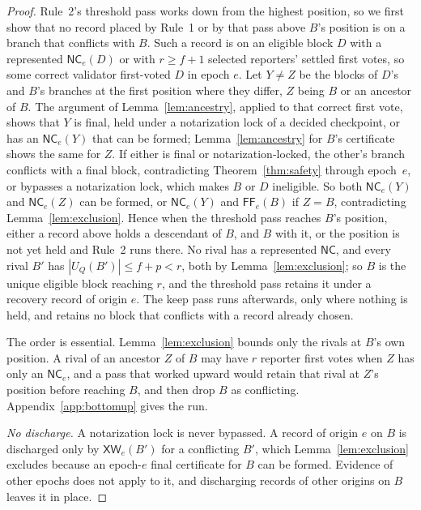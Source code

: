 \documentclass[conference]{IEEEtran}
\newcommand{\NC}{\mathsf{NC}}
\newcommand{\XW}{\mathsf{XW}}
\newcommand{\FF}{\mathsf{FF}}
\begin{document}
\begin{proof}
Rule~2's threshold pass works down from the highest position, so we first show that no record placed by Rule~1 or by that pass above $B$'s position is on a branch that conflicts with $B$. Such a record is on an eligible block $D$ with a represented $\NC_e(D)$ or with $r\ge f+1$ selected reporters' settled first votes, so some correct validator first-voted $D$ in epoch $e$. Let $Y\neq Z$ be the blocks of $D$'s and $B$'s branches at the first position where they differ, $Z$ being $B$ or an ancestor of $B$. The argument of Lemma~\ref{lem:ancestry}, applied to that correct first vote, shows that $Y$ is final, held under a notarization lock of a decided checkpoint, or has an $\NC_e(Y)$ that can be formed; Lemma~\ref{lem:ancestry} for $B$'s certificate shows the same for $Z$. If either is final or notarization-locked, the other's branch conflicts with a final block, contradicting Theorem~\ref{thm:safety} through epoch~$e$, or bypasses a notarization lock, which makes $B$ or $D$ ineligible. So both $\NC_e(Y)$ and $\NC_e(Z)$ can be formed, or $\NC_e(Y)$ and $\FF_e(B)$ if $Z=B$, contradicting Lemma~\ref{lem:exclusion}. Hence when the threshold pass reaches $B$'s position, either a record above holds a descendant of $B$, and $B$ with it, or the position is not yet held and Rule~2 runs there. No rival has a represented $\NC$, and every rival $B'$ has $|U_Q(B')|\le f+p<r$, both by Lemma~\ref{lem:exclusion}; so $B$ is the unique eligible block reaching $r$, and the threshold pass retains it under a recovery record of origin $e$. The keep pass runs afterwards, only where nothing is held, and retains no block that conflicts with a record already chosen.

The order is essential. Lemma~\ref{lem:exclusion} bounds only the rivals at $B$'s own position. A rival of an ancestor $Z$ of $B$ may have $r$ reporter first votes when $Z$ has only an $\NC_e$, and a pass that worked upward would retain that rival at $Z$'s position before reaching $B$, and then drop $B$ as conflicting. Appendix~\ref{app:bottomup} gives the run.

\emph{No discharge.} A notarization lock is never bypassed. A record of origin $e$ on $B$ is discharged only by $\XW_e(B')$ for a conflicting $B'$, which Lemma~\ref{lem:exclusion} excludes because an epoch-$e$ final certificate for $B$ can be formed. Evidence of other epochs does not apply to it, and discharging records of other origins on $B$ leaves it in place.


\end{proof}
\end{document}
